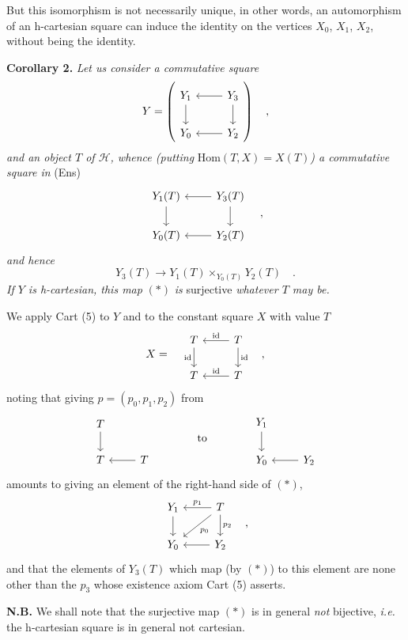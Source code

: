 \documentclass[11pt]{article}
\newcommand{\printedpage}[1]{\marginpar{\footnotesize p.~#1}}
\newcommand{\msp}[1]{\marginpar{\footnotesize [#1]}}
\begin{document}
But this isomorphism is not necessarily unique, in other words, an automorphism of an h-cartesian square can induce the identity on the vertices $X_0$, $X_1$, $X_2$, without being the identity.

\printedpage{5}

\msp{page 6}
\textbf{Corollary 2.} \textit{Let us consider a commutative square}
\[
Y = \left(\begin{tikzcd}
Y_1 \ar[d] & Y_3 \ar[l] \ar[d] \\
Y_0 & Y_2 \ar[l]
\end{tikzcd}\right) \quad ,
\]
\textit{and an object $T$ of $\mathcal{H}$, whence (putting} $\mathrm{Hom}(T,X) = X(T)$\textit{) a commutative square in} (Ens)
\[
\begin{tikzcd}
Y_1(T) \ar[d] & Y_3(T) \ar[l] \ar[d] \\
Y_0(T) & Y_2(T) \ar[l]
\end{tikzcd} \quad ,
\]
\textit{and hence}
\[
Y_3(T) \longrightarrow Y_1(T) \times_{Y_0(T)} Y_2(T) \quad . \tag*{$(*)$}
\]
\textit{If $Y$ is h-cartesian, this map} $(*)$ \textit{is} surjective \textit{whatever $T$ may be.}

We apply Cart (5) to $Y$ and to the constant square $X$ with value $T$
\[
X = \quad
\begin{tikzcd}
T \ar[d, "\mathrm{id}"'] & T \ar[l, "\mathrm{id}"'] \ar[d, "\mathrm{id}"] \\
T & T \ar[l, "\mathrm{id}"']
\end{tikzcd} \quad ,
\]
noting that giving $p = (p_0, p_1, p_2)$ from
\[
\begin{tikzcd}
T \ar[d] & \\
T & T \ar[l]
\end{tikzcd}
\qquad\qquad \text{to} \qquad\qquad
\begin{tikzcd}
Y_1 \ar[d] & \\
Y_0 & Y_2 \ar[l]
\end{tikzcd}
\]
amounts to giving an element of the right-hand side of $(*)$,
\[
\begin{tikzcd}
Y_1 \ar[d] & T \ar[l, "p_1"'] \ar[dl, "p_0"] \ar[d, "p_2"] \\
Y_0 & Y_2 \ar[l]
\end{tikzcd} \quad ,
\]
and that the elements of $Y_3(T)$ which map (by $(*)$) to this element are none other than the $p_3$ whose existence axiom Cart (5) asserts.

\textbf{N.B.} We shall note that the surjective map $(*)$ is in general \textit{not} bijective, \textit{i.e.} the h-cartesian square is in general not cartesian.
\end{document}
